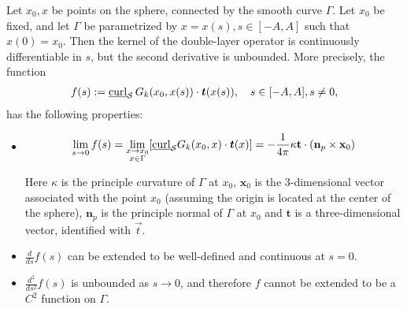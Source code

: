 \begin{lemma}
\label{regularity}
Let $x_0,x$ be points on the sphere, connected by the smooth curve
$\Gamma$. Let $x_0$ be fixed, and let $\Gamma$ be parametrized by
$x=x(s), s\in[-A,A]$ such that $x(0)=x_{0}$. Then the kernel of the
double-layer operator is continuously differentiable in $s$, but the
second derivative is unbounded. More precisely, the function 
\begin{align*}
  f(s):=\underline{\mbox{curl}}_{\S}\,
    G_{k}(x_0,x(s))\cdot\vec{t}(x(s)), \quad s\in[-A,A], s \neq 0,
\end{align*}
has the following properties:
\begin{itemize}
\item 
\begin{align*} 
  \lim_{\substack {s \rightarrow 0}} f(s) = 
   \lim_{\substack {x \rightarrow x_{0} \\ x \in \Gamma}}
   [\underline{\mbox{curl}}_{\S}G_{k}(x_{0},x) \cdot \vec{t}(x)] =  
   -\frac{1}{4\pi} \kappa \mathbf{t}\cdot(\mathbf{n}_{p}
    \times \mathbf{x}_0)
\end{align*}

Here $\kappa$ is the principle curvature of $\Gamma$ at $x_{0}$,
$\mathbf{x}_0$ is the 3-dimensional vector associated with the point
$x_0$ (assuming the origin is located at the center of the sphere),
$\mathbf{n}_p$ is the principle normal of $\Gamma$ at $x_0$ and
$\mathbf{t}$ is a three-dimensional vector, identified with $\vec{t}$.
\item $\frac{d}{ds}f(s)$ can be extended to be well-defined and
continuous at $s=0$.
\item $\frac{d^2}{ds^2} f(s)$ is unbounded as $s\rightarrow 0$, and
therefore $f$ cannot be extended to be a $C^{2}$ function on $\Gamma$.
\end{itemize}
\end{lemma}

